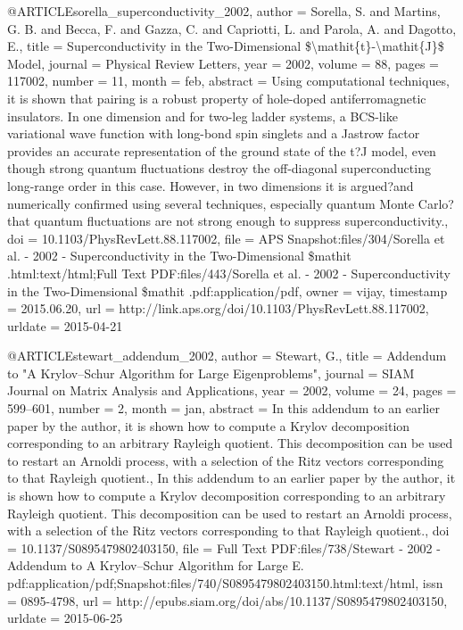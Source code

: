 @ARTICLE{sorella_superconductivity_2002,
  author = {Sorella, S. and Martins, G. B. and Becca, F. and Gazza, C. and Capriotti,
	L. and Parola, A. and Dagotto, E.},
  title = {Superconductivity in the {Two}-{Dimensional} \${\textbackslash}mathit\{t\}-{\textbackslash}mathit\{{J}\}\$
	{Model}},
  journal = {Physical Review Letters},
  year = {2002},
  volume = {88},
  pages = {117002},
  number = {11},
  month = feb,
  abstract = {Using computational techniques, it is shown that pairing is a robust
	property of hole-doped antiferromagnetic insulators. In one dimension
	and for two-leg ladder systems, a BCS-like variational wave function
	with long-bond spin singlets and a Jastrow factor provides an accurate
	representation of the ground state of the t?J model, even though
	strong quantum fluctuations destroy the off-diagonal superconducting
	long-range order in this case. However, in two dimensions it is argued?and
	numerically confirmed using several techniques, especially quantum
	Monte Carlo?that quantum fluctuations are not strong enough to suppress
	superconductivity.},
  doi = {10.1103/PhysRevLett.88.117002},
  file = {APS Snapshot:files/304/Sorella et al. - 2002 - Superconductivity in the Two-Dimensional \$mathit .html:text/html;Full Text PDF:files/443/Sorella et al. - 2002 - Superconductivity in the Two-Dimensional \$mathit .pdf:application/pdf},
  owner = {vijay},
  timestamp = {2015.06.20},
  url = {http://link.aps.org/doi/10.1103/PhysRevLett.88.117002},
  urldate = {2015-04-21}
}

@ARTICLE{stewart_addendum_2002,
  author = {Stewart, G.},
  title = {Addendum to "{A} {Krylov}--{Schur} {Algorithm} for {Large} {Eigenproblems}"},
  journal = {SIAM Journal on Matrix Analysis and Applications},
  year = {2002},
  volume = {24},
  pages = {599--601},
  number = {2},
  month = jan,
  abstract = {In this addendum to an earlier paper by the author, it is shown how
	to compute a Krylov decomposition corresponding to an arbitrary Rayleigh
	quotient. This decomposition can be used to restart an Arnoldi process,
	with a selection of the Ritz vectors corresponding to that Rayleigh
	quotient., In this addendum to an earlier paper by the author, it
	is shown how to compute a Krylov decomposition corresponding to an
	arbitrary Rayleigh quotient. This decomposition can be used to restart
	an Arnoldi process, with a selection of the Ritz vectors corresponding
	to that Rayleigh quotient.},
  doi = {10.1137/S0895479802403150},
  file = {Full Text PDF:files/738/Stewart - 2002 - Addendum to A Krylov--Schur Algorithm for Large E.   pdf:application/pdf;Snapshot:files/740/S0895479802403150.html:text/html},
  issn = {0895-4798},
  url = {http://epubs.siam.org/doi/abs/10.1137/S0895479802403150},
  urldate = {2015-06-25}
}

